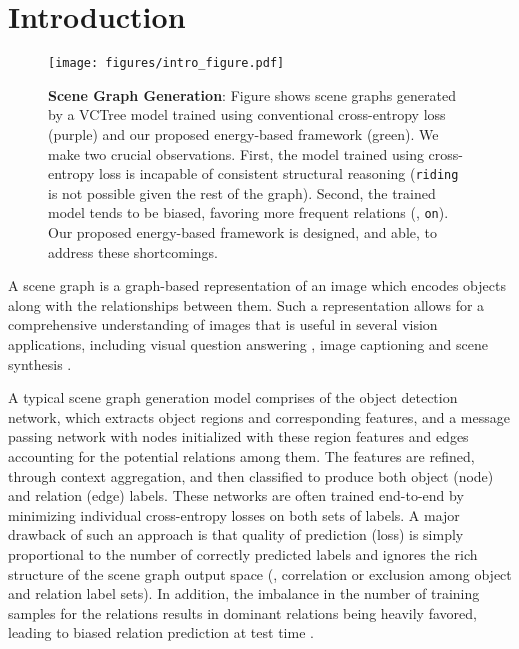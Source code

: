 \documentclass[final]{cvpr}
\begin{document}
\section{Introduction}
\label{sec:introduction}
\begin{figure}[t]
    \centering
    \texttt{[image: figures/intro\_figure.pdf]}
    \caption{\textbf{Scene Graph Generation}: Figure shows scene graphs generated by a VCTree \cite{tang2019learning} model trained using conventional cross-entropy loss (purple) and our proposed energy-based framework (green). We make two crucial observations. First, the model trained using cross-entropy loss is incapable of consistent structural reasoning ({\tt \small riding} is not possible given the rest of the graph). Second, the trained model tends to be biased, favoring more frequent relations (\eg, {\tt \small on}).
Our proposed energy-based framework is designed, and able, to address these shortcomings.}
\label{fig:intro_figure}
\end{figure}

A scene graph is a graph-based representation of an image which encodes objects along with the relationships between them. Such a representation allows for a comprehensive understanding of images that is useful in several vision applications, including visual question answering \cite{hudson2018gqa, tang2019learning}, image captioning \cite{gu2019unpaired, yang2019auto} and scene synthesis \cite{herzig2019learning, johnson2018image}.

A typical scene graph generation model comprises of the object detection network, which extracts object regions and corresponding features, and a message passing network with nodes initialized with these region features and edges accounting for the potential relations among them. 
The features are refined, through context aggregation, and then classified to produce both object (node) and relation (edge) labels. These networks are often trained end-to-end by minimizing individual cross-entropy losses on both sets of labels. 
A major drawback of such an approach is that quality of prediction (loss) is simply proportional to the number of correctly predicted labels and ignores the rich structure of the scene graph output space (\eg, correlation or exclusion among object and relation label sets). 
In addition, the imbalance in the number of training samples for the relations results in dominant relations being heavily favored, leading to biased relation prediction at test time \cite{tang2020unbiased}.
\end{document}
